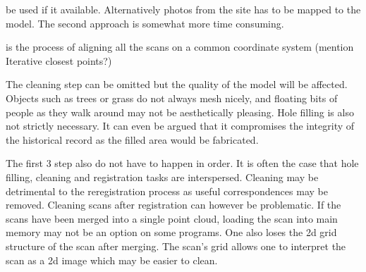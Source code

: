  be used if it available. Alternatively photos from the site has to be mapped to the model. The second approach is somewhat more time consuming.

is the process of aligning all the scans on a common coordinate system (mention Iterative closest points?)

The cleaning step can be omitted but the quality of the model will be affected. Objects such as trees or grass do not always mesh nicely, and floating bits of people as they walk around may not be aesthetically pleasing. Hole filling is also not strictly necessary. It can even be argued that it compromises the integrity of the historical record as the filled area would be fabricated.

The first 3 step also do not have to happen in order. It is often the case that hole filling, cleaning and registration tasks are interspersed. Cleaning may be detrimental to the reregistration process as useful correspondences may be removed. Cleaning scans after registration can however be problematic. If the scans have been merged into a single point cloud, loading the scan into main memory may not be an option on some programs. One also loses the 2d grid structure of the scan after merging. The scan's grid allows one to interpret the scan as a 2d image which may be easier to clean.









